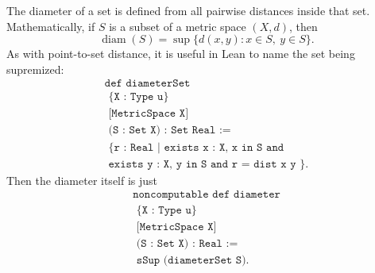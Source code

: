 \begin{remark*}
The diameter of a set is defined from all pairwise distances inside that set.
Mathematically, if \(S\) is a subset of a metric space \((X,d)\), then
\[
  \operatorname{diam}(S)
  =
  \sup \{ d(x,y) : x \in S,\ y \in S \}.
\]
As with point-to-set distance, it is useful in Lean to name the set being
supremized:
\[
\begin{gathered}
  \texttt{def diameterSet}\\
  \texttt{\ \ \ \ \{X : Type u\}}\\
  \texttt{\ \ \ \ [MetricSpace X]}\\
  \texttt{\ \ \ \ (S : Set X) : Set Real :=}\\
  \texttt{\ \ \{ r : Real | exists x : X, x in S and}\\
  \texttt{\ \ \ \ exists y : X, y in S and r = dist x y \}.}
\end{gathered}
\]
Then the diameter itself is just
\[
\begin{gathered}
  \texttt{noncomputable def diameter}\\
  \texttt{\ \ \ \ \{X : Type u\}}\\
  \texttt{\ \ \ \ [MetricSpace X]}\\
  \texttt{\ \ \ \ (S : Set X) : Real :=}\\
  \texttt{\ \ sSup (diameterSet S).}
\end{gathered}
\]
\end{remark*}


